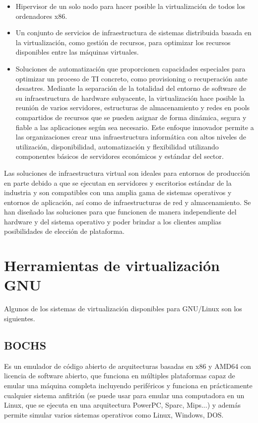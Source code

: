 \documentclass[10pt,a4paper,spanish]{report}
\begin{document}
  \begin{itemize}
    \item Hipervisor de un solo nodo para hacer posible la virtualización de todos los ordenadores x86.
    \item Un conjunto de servicios de infraestructura de sistemas distribuida basada en la virtualización, como gestión de recursos, para optimizar los recursos disponibles entre las máquinas virtuales.
    \item Soluciones de automatización que proporcionen capacidades especiales para optimizar un proceso de TI concreto, como provisioning o recuperación ante desastres. Mediante la separación de la totalidad del entorno de software de su infraestructura de hardware subyacente, la virtualización hace posible la reunión de varios servidores, estructuras de almacenamiento y redes en pools compartidos de recursos que se pueden asignar de forma dinámica, segura y fiable a las aplicaciones según sea necesario. Este enfoque innovador permite a las organizaciones crear una infraestructura informática con altos niveles de utilización, disponibilidad, automatización y flexibilidad utilizando componentes básicos de servidores económicos y estándar del sector.
  \end{itemize}

  \noindent
  Las soluciones de infraestructura virtual son ideales para entornos de producción en parte debido a que se ejecutan en servidores y escritorios estándar de la industria y son compatibles con una amplia gama de sistemas operativos y entornos de aplicación, así como de infraestructuras de red y almacenamiento. Se han diseñado las soluciones para que funcionen de manera independiente del hardware y del sistema operativo y poder brindar a los clientes amplias posibilidades de elección de plataforma.

  \chapter{Herramientas de virtualización GNU}

  \noindent
  Algunos de los sistemas de virtualización disponibles para GNU/Linux son los siguientes.

  \section{BOCHS}

  \noindent
  Es un emulador de código abierto de arquitecturas basadas en x86 y AMD64 con licencia de software abierto, que funciona en múltiples plataformas capaz de emular una máquina completa incluyendo periféricos y funciona en prácticamente cualquier sistema anfitrión (se puede usar para emular una computadora en un Linux, que se ejecuta en una arquitectura PowerPC, Sparc, Mips...) y además permite simular varios sistemas operativos como Linux, Windows, DOS. \\
\end{document}
